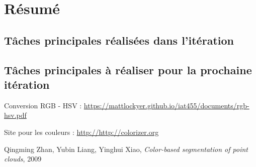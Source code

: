 \documentclass[12pt,titlepage,french]{article}
\begin{document}

\section{Résumé}
\subsection{Tâches principales réalisées dans l'itération}

\subsection{Tâches principales à réaliser pour la prochaine itération}

\begin{thebibliography}{3}

 Conversion RGB - HSV : \newline
\url{https://mattlockyer.github.io/iat455/documents/rgb-hsv.pdf}

 Site pour les couleurs : \newline
\url{http://http://colorizer.org}

 Qingming Zhan, Yubin Liang, Yinghui Xiao, \textit{Color-based segmentation of point clouds}, 2009
\end{thebibliography}
\end{document}
